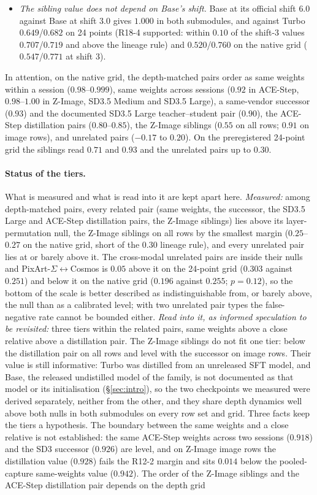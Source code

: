 \documentclass[11pt]{article}
\begin{document}
\begin{itemize}
 \item \emph{The sibling value does not depend on Base's shift.} Base at its official shift $6.0$ against Base at shift $3.0$ gives $1.000$ in both submodules, and against Turbo $0.649$/$0.682$ on 24 points (R18-4 supported: within $0.10$ of the shift-3 values $0.707$/$0.719$ and above the lineage rule) and $0.520$/$0.760$ on the native grid ($0.547$/$0.771$ at shift 3).
\end{itemize}
In attention, on the native grid, the depth-matched pairs order as same weights within a session ($0.98$--$0.999$), same weights across sessions ($0.92$ in ACE-Step, $0.98$--$1.00$ in Z-Image, SD3.5 Medium and SD3.5 Large), a same-vendor successor ($0.93$) and the documented SD3.5 Large teacher--student pair ($0.90$), the ACE-Step distillation pairs ($0.80$--$0.85$), the Z-Image siblings ($0.55$ on all rows; $0.91$ on image rows), and unrelated pairs ($-0.17$ to $0.20$). On the preregistered 24-point grid the siblings read $0.71$ and $0.93$ and the unrelated pairs up to $0.30$. \paragraph{Status of the tiers.}\label{sec:tierstatus} What is measured and what is read into it are kept apart here. \emph{Measured:} among depth-matched pairs, every related pair (same weights, the successor, the SD3.5 Large and ACE-Step distillation pairs, the Z-Image siblings) lies above its layer-permutation null, the Z-Image siblings on all rows by the smallest margin ($0.25$--$0.27$ on the native grid, short of the $0.30$ lineage rule), and every unrelated pair lies at or barely above it. The cross-modal unrelated pairs are inside their nulls and PixArt-$\Sigma$$\leftrightarrow$Cosmos is $0.05$ above it on the 24-point grid ($0.303$ against $0.251$) and below it on the native grid ($0.196$ against $0.255$; $p=0.12$), so the bottom of the scale is better described as indistinguishable from, or barely above, the null than as a calibrated level; with two unrelated pair types the false-negative rate cannot be bounded either. \emph{Read into it, as informed speculation to be revisited:} three tiers within the related pairs, same weights above a close relative above a distillation pair. The Z-Image siblings do not fit one tier: below the distillation pair on all rows and level with the successor on image rows. Their value is still informative: Turbo was distilled from an unreleased SFT model, and Base, the released undistilled model of the family, is not documented as that model or its initialisation (\S\ref{sec:intro}), so the two checkpoints we measured were derived separately, neither from the other, and they share depth dynamics well above both nulls in both submodules on every row set and grid. Three facts keep the tiers a hypothesis. The boundary between the same weights and a close relative is not established: the same ACE-Step weights across two sessions ($0.918$) and the SD3 successor ($0.926$) are level, and on Z-Image image rows the distillation value ($0.928$) fails the R12-2 margin and sits $0.014$ below the pooled-capture same-weights value ($0.942$). The order of the Z-Image siblings and the ACE-Step distillation pair depends on the depth grid 
\end{document}

